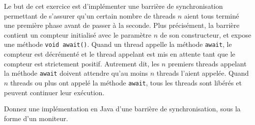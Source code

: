
\begingroup

\begin{exercice}
  \label{exo:monitors/barrier}

  Le but de cet exercice est d'implémenter une barrière de synchronisation permettant de s'assurer qu'un certain nombre de threads $n$ aient
  tous terminé une première phase avant de passer à la seconde. Plus précisément, la barrière contient un compteur initialisé
  avec le paramètre $n$ de son constructeur, et expose une méthode \lstinline{void await()}.
  Quand un thread appelle la méthode \lstinline{await}, le compteur est décrémenté et le thread appelant
  est mis en attente tant que le compteur est strictement positif. Autrement dit, les $n$ premiers threads
  appelant la méthode \lstinline{await} doivent attendre qu'au moins $n$ threads l'aient appelée.
  Quand $n$ threads ou plus ont appelé la méthode \lstinline{await}, tous les threads sont libérés
  et peuvent continuer leur exécution.

  \begin{question}
  \item Donnez une implémentation en Java d'une barrière de synchronisation, sous la forme d'un moniteur. 
  \end{question}

\end{exercice}

\endgroup
\endinput
